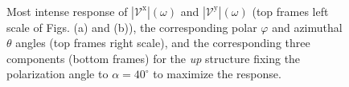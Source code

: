 \documentclass[prb,11pt,tightenlines,twocolumn,aps]{revtex4-1}
\begin{document}
\begin{figure}[t]
    \centering
    \\
    
    \caption{Most intense response of
    $|\mathcal{V}^{\mathrm{x}}|(\omega)$ and
    $|\mathcal{V}^{\mathrm{y}}|(\omega)$ (top frames left scale of Figs. (a) and
    (b)), the corresponding polar $\varphi$ and azimuthal $\theta$ angles (top
    frames right scale), and the corresponding three components (bottom frames)
    for the \emph{up} structure fixing the polarization angle to
    $\alpha=40^{\circ}$ to maximize the response.}
    \label{fig:up-vab-comp-rtp-1}
\end{figure}
\end{document}
